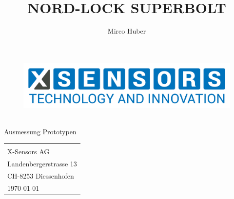 \documentclass[12pt,a4paper]{article}
\author{Mirco Huber}
\title{NORD-LOCK SUPERBOLT}
\newcommand{\subtitle}{Ausmessung Prototypen}
\begin{document}
	\thispagestyle{empty}
	\begin{titlepage}
		\begin{figure}[H]
			\centering
			\includegraphics[width=.5\linewidth]{Logos/X-SENSORS-Logo_Slogan_EN_Transparent.png}
		\end{figure}
		\vspace*{3cm}
		\begin{center}
			\Huge {\thetitle} \\\vspace*{.5cm}
			\small {\subtitle}
		\end{center}
		\vspace{12cm}
		\hspace{.6\linewidth} 
		\begin{tabular}{l}	
			\small{\theauthor} \\[.5pt]  
			\small{X-Sensors AG} \\ 
			\small{Landenbergerstrasse 13} \\
			\small{CH-8253 Diessenhofen} \\ [.5cm] 	
			\today
		\end{tabular}
	\end{titlepage}

	\newpage
	\setcounter{page}{1}
	\pagestyle{fancy}
	
	
	
\end{document}
